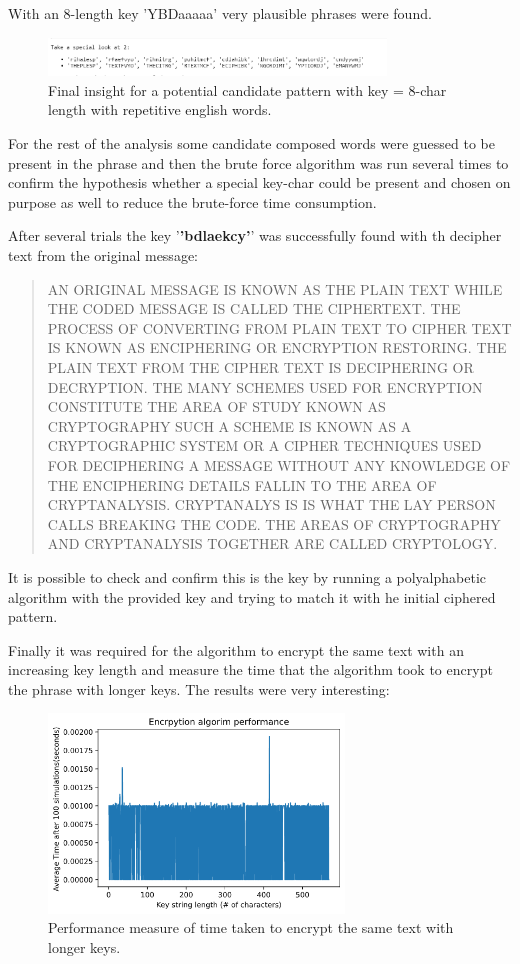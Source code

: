 \documentclass[letterpaper,12pt]{article}
\begin{document}
With an 8-length key 'YBDaaaaa' very plausible phrases were found.

\begin{figure}[H]
    \centering
    \includegraphics[width=0.8\textwidth]{assets/bruteforce.png}
    \caption{Final insight for a potential candidate pattern with key = 8-char length with repetitive english words.}
\end{figure}

For the rest of the analysis some candidate composed words were guessed to be present in the phrase and then the brute force algorithm was run several times to confirm the hypothesis whether a special key-char could be present and chosen on purpose as well to reduce the brute-force time consumption.

After several trials the key '\textbf{'bdlaekcy'}' was successfully found with th decipher text from the original message:

\begin{quote}
    AN ORIGINAL MESSAGE IS KNOWN AS THE PLAIN TEXT WHILE THE CODED MESSAGE IS CALLED THE CIPHERTEXT. THE PROCESS OF CONVERTING FROM PLAIN TEXT TO CIPHER TEXT IS KNOWN AS ENCIPHERING OR ENCRYPTION RESTORING. THE PLAIN TEXT FROM THE CIPHER TEXT IS DECIPHERING OR DECRYPTION. THE MANY SCHEMES USED FOR ENCRYPTION CONSTITUTE THE AREA OF STUDY KNOWN AS CRYPTOGRAPHY SUCH A SCHEME IS KNOWN AS A CRYPTOGRAPHIC SYSTEM OR A CIPHER TECHNIQUES USED FOR DECIPHERING A MESSAGE WITHOUT ANY KNOWLEDGE OF THE ENCIPHERING DETAILS FALLIN TO THE AREA OF CRYPTANALYSIS. CRYPTANALYS IS IS WHAT THE LAY PERSON CALLS BREAKING THE CODE. THE AREAS OF CRYPTOGRAPHY AND CRYPTANALYSIS TOGETHER ARE CALLED CRYPTOLOGY.
\end{quote}

It is possible to check and confirm this is the key by running a polyalphabetic algorithm with the provided key and trying to match it with he initial ciphered pattern.

Finally it was required for the algorithm to encrypt the same text with an increasing key length and measure the time that the algorithm took to encrypt the phrase with longer keys. The results were very interesting:
\begin{figure}[H]
    \centering
    \includegraphics[width=0.7\textwidth]{assets/timeconsumption.png}
    \caption{Performance measure of time taken to encrypt the same text with longer keys.}
\end{figure}
\end{document}
